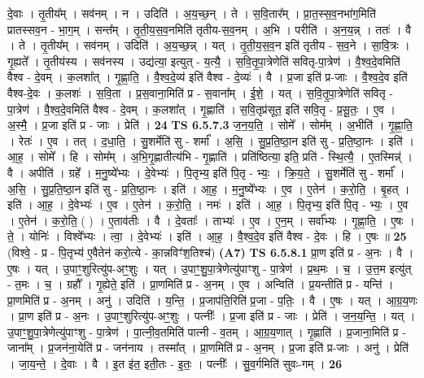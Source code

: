 \documentclass[17pt]{extarticle}
\begin{document}
                  दे॒वाः । तृ॒तीय᳚म् । सव॑नम् । न । उदिति॑ । अ॒य॒च्छ॒न् । ते । स॒वि॒तार᳚म् । प्रा॒त॒स्स॒व॒नभा॑ग॒मिति॑ प्रातस्सव॒न - भा॒ग॒म् । सन्त᳚म् । तृ॒ती॒य॒स॒व॒नमिति॑ तृतीय-स॒व॒नम् । अ॒भि । परीति॑ । अ॒न॒य॒न्न् । ततः॑ । वै । ते । तृ॒तीय᳚म् । सव॑नम् । उदिति॑ । अ॒य॒च्छ॒न्न् । यत् । तृ॒ती॒य॒स॒व॒न इति॑ तृतीय - स॒व॒ने । सा॒वि॒त्रः । गृ॒ह्यते᳚ । तृ॒तीय॑स्य । सव॑नस्य । उद्य॑त्या॒ इत्युत् - य॒त्यै॒ । स॒वि॒तृ॒पा॒त्रेणेति॑ सवितृ-पा॒त्रेण॑ । वै॒श्व॒दे॒वमिति॑ वैश्व - दे॒वम् । क॒लशा᳚त् । गृ॒ह्णा॒ति॒ । वै॒श्व॒दे॒व्य॑ इति॑ वैश्व - दे॒व्यः॑ । वै । प्र॒जा इति॑ प्र-जाः । वै॒श्व॒दे॒व इति॑ वैश्व-दे॒वः । क॒लशः॑ । स॒वि॒ता । प्र॒स॒वाना॒मिति॑ प्र - स॒वाना᳚म् । ई॒शे॒ । यत् । स॒वि॒तृ॒पा॒त्रेणेति॑ सवितृ - पा॒त्रेण॑ । वै॒श्व॒दे॒वमिति॑ वैश्व - दे॒वम् । क॒लशा᳚त् । गृ॒ह्णाति॑ । स॒वि॒तृप्र॑सूत॒ इति॑ सवि॒तृ - प्र॒सू॒तः॒ । ए॒व । अ॒स्मै॒ । प्र॒जा इति॑ प्र - जाः । प्रेति॑ । \textbf{  24} \newline
                  \newline
                                \textbf{ TS 6.5.7.3} \newline
                  ज॒न॒य॒ति॒ । सोमे᳚ । सोम᳚म् । अ॒भीति॑ । गृ॒ह्णा॒ति॒ । रेतः॑ । ए॒व । तत् । द॒धा॒ति॒ । सु॒शर्मेति॑ सु - शर्मा᳚ । अ॒सि॒ । सु॒प्र॒ति॒ष्ठा॒न इति॑ सु - प्र॒ति॒ष्ठा॒नः । इति॑ । आ॒ह॒ । सोमे᳚ । हि । सोम᳚म् । अ॒भि॒गृ॒ह्णातीत्य॑भि - गृ॒ह्णाति॑ । प्रति॑ष्ठित्या॒ इति॒ प्रति॑ - स्थि॒त्यै॒ । ए॒तस्मिन्न्॑ । वै । अपीति॑ । ग्रहे᳚ । म॒नु॒ष्ये᳚भ्यः । दे॒वेभ्यः॑ । पि॒तृभ्य॒ इति॑ पि॒तृ - भ्यः॒ । क्रि॒य॒ते॒ । सु॒शर्मेति॑ सु - शर्मा᳚ । अ॒सि॒ । सु॒प्र॒ति॒ष्ठा॒न इति॑ सु - प्र॒ति॒ष्ठा॒नः । इति॑ । आ॒ह॒ । म॒नु॒ष्ये᳚भ्यः । ए॒व । ए॒तेन॑ । क॒रो॒ति॒ । बृ॒हत् । इति॑ । आ॒ह॒ । दे॒वेभ्यः॑ । ए॒व । ए॒तेन॑ । क॒रो॒ति॒ । नमः॑ । इति॑ । आ॒ह॒ । पि॒तृभ्य॒ इति॑ पि॒तृ - भ्यः॒ । ए॒व । ए॒तेन॑ । क॒रो॒ति॒ ( ) । ए॒ताव॑तीः । वै । दे॒वताः᳚ । ताभ्यः॑ । ए॒व । ए॒न॒म् । सर्वा᳚भ्यः । गृ॒ह्णा॒ति॒ । ए॒षः । ते॒ । योनिः॑ । विश्वे᳚भ्यः । त्वा॒ । दे॒वेभ्यः॑ । इति॑ । आ॒ह॒ । वै॒श्व॒दे॒व इति॑ वैश्व - दे॒वः । हि । ए॒षः ॥ \textbf{  25 } \newline
                  \newline
                      (विश्वे॒ - प्र - पि॒तृभ्य॑ ए॒वैतेन॑ करो॒त्ये - का॒न्नविꣳ॑श॒तिश्च॑)  \textbf{(A7)} \newline \newline
                                \textbf{ TS 6.5.8.1} \newline
                  प्रा॒ण इति॑ प्र - अ॒नः । वै । ए॒षः । यत् । उ॒पाꣳ॒॒शुरित्यु॑प-अꣳ॒॒शुः । यत् । उ॒पाꣳ॒॒शु॒पा॒त्रेणेत्यु॑पाꣳशु - पा॒त्रेण॑ । प्र॒थ॒मः । च॒ । उ॒त्त॒म इत्यु॑त् - त॒मः । च॒ । ग्रहौ᳚ । गृ॒ह्येते॒ इति॑ । प्रा॒णमिति॑ प्र - अ॒नम् । ए॒व । अन्विति॑ । प्र॒यन्तीति॑ प्र - यन्ति॑ । प्रा॒णमिति॑ प्र - अ॒नम् । अनु॑ । उदिति॑ । य॒न्ति॒ । प्र॒जाप॑ति॒रिति॑ प्र॒जा - प॒तिः॒ । वै । ए॒षः । यत् । आ॒ग्र॒य॒णः । प्रा॒ण इति॑ प्र - अ॒नः । उ॒पाꣳ॒॒शुरित्यु॑प-अꣳ॒॒शुः । पत्नीः᳚ । प्र॒जा इति॑ प्र - जाः । प्रेति॑ । ज॒न॒य॒न्ति॒ । यत् । उ॒पाꣳ॒॒शु॒पा॒त्रेणेत्यु॑पाꣳशु - पा॒त्रेण॑ । पा॒त्नी॒व॒तमिति॑ पात्नी - व॒तम् । आ॒ग्र॒य॒णात् । गृ॒ह्णाति॑ । प्र॒जाना॒मिति॑ प्र - जाना᳚म् । प्र॒जन॑ना॒येति॑ प्र - जन॑नाय । तस्मा᳚त् । प्रा॒णमिति॑ प्र - अ॒नम् । प्र॒जा इति॑ प्र-जाः । अनु॑ । प्रेति॑ । जा॒य॒न्ते॒ । दे॒वाः । वै । इ॒त इ॑त॒ इती॒तः - इ॒तः॒ । पत्नीः᳚ । सु॒व॒र्गमिति॑ सुवः-गम् । \textbf{  26} \newline
\end{document}
